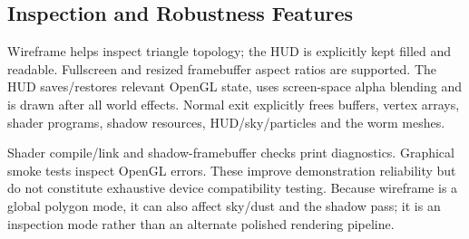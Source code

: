 \subsection{Inspection and Robustness Features}
Wireframe helps inspect triangle topology; the HUD is explicitly kept filled and readable. Fullscreen and resized framebuffer aspect ratios are supported. The HUD saves/restores relevant OpenGL state, uses screen-space alpha blending and is drawn after all world effects. Normal exit explicitly frees buffers, vertex arrays, shader programs, shadow resources, HUD/sky/particles and the worm meshes.

Shader compile/link and shadow-framebuffer checks print diagnostics. Graphical smoke tests inspect OpenGL errors. These improve demonstration reliability but do not constitute exhaustive device compatibility testing. Because wireframe is a global polygon mode, it can also affect sky/dust and the shadow pass; it is an inspection mode rather than an alternate polished rendering pipeline.
